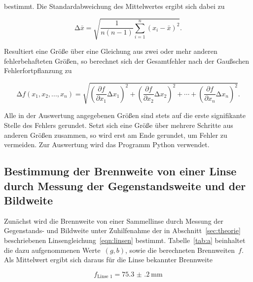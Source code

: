 \documentclass[
  parskip=half,
  bibliography=totoc,     %
  captions=tableheading,  %
  titlepage=firstiscover, %
]{scrartcl}
\begin{document}
bestimmt. Die Standardabweichung des Mittelwertes ergibt sich dabei zu

\begin{equation}
    \mathup{\Delta}\bar{x}=\sqrt{\frac{1}{n(n-1)}\sum_{i=1}^n\left(x_i-\bar{x}\right)^2}.
    \label{eq:standardabweichung}
\end{equation}

Resultiert eine Größe über eine Gleichung aus zwei oder mehr anderen fehlerbehafteten Größen, so
berechnet sich der Gesamtfehler nach der Gaußschen Fehlerfortpflanzung zu

\begin{equation}
    \mathup{\Delta}f(x_1,x_2,...,x_n)=\sqrt{\left(\frac{\partial f}{\partial x_1}\mathup{\Delta}x_1\right)^2+\left(\frac{\partial f}{\partial x_2}\mathup{\Delta}x_2\right)^2+ \dotsb +\left(\frac{\partial f}{\partial x_n}\mathup{\Delta}x_n\right)^2}.
    \label{eq:fehlerfortpflanzung}
\end{equation}

Alle in der Auswertung angegebenen Größen sind stets auf die erste signifikante Stelle des
Fehlers gerundet. Setzt sich eine Größe über mehrere Schritte aus anderen Größen zusammen,
so wird erst am Ende gerundet, um Fehler zu vermeiden. Zur Auswertung wird das Programm Python verwendet.
\subsection{Bestimmung der Brennweite von einer Linse durch Messung der Gegenstandsweite und der Bildweite}

Zunächst wird die Brennweite von einer Sammellinse durch Messung der Gegenstands- und Bildweite unter
Zuhilfenahme der in Abschnitt~\ref{sec:theorie} beschriebenen Linsengleichung~\eqref{eqn:linsen}
bestimmt. Tabelle~\ref{tab:a} beinhaltet die dazu aufgenommenen Werte~$(g,b)$, sowie
die berechneten Brennweiten~$f$. Als Mittelwert ergibt sich daraus für die Linse bekannter Brennweite

\begin{equation}
f_{\text{Linse 1}} = \SI{75.3(2)}{\milli\metre}
\end{equation}
\end{document}
